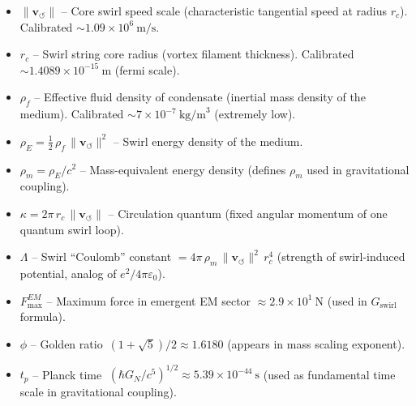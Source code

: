\documentclass[10pt,a4paper]{article}
\begin{document}
\begin{tcolorbox}[title=\textbf{SST Canonical Constants}]
\small
\begin{itemize}\itemsep1pt
\item $\|\mathbf{v}_{\!\boldsymbol{\circlearrowleft}}\|$ -- Core swirl speed scale (characteristic tangential speed at radius $r_c$). Calibrated $\sim1.09\times10^6~\text{m/s}$.
\item $r_c$ -- Swirl string core radius (vortex filament thickness). Calibrated $\sim1.4089\times10^{-15}~\text{m}$ (fermi scale).
\item $\rho_{\!f}$ -- Effective fluid density of condensate (inertial mass density of the medium). Calibrated $\sim7\times10^{-7}~\text{kg/m}^3$ (extremely low).
\item $\rho_{\!E} = \frac{1}{2}\,\rho_{\!f}\,\|\mathbf{v}_{\!\boldsymbol{\circlearrowleft}}\|^2$ -- Swirl energy density of the medium.
\item $\rho_{\!m} = \rho_{\!E}/c^2$ -- Mass-equivalent energy density (defines $\rho_{\!m}$ used in gravitational coupling).
\item $\kappa = 2\pi\,r_c\,\|\mathbf{v}_{\!\boldsymbol{\circlearrowleft}}\|$ -- Circulation quantum (fixed angular momentum of one quantum swirl loop).
\item $\Lambda$ -- Swirl “Coulomb” constant $=4\pi\,\rho_{\!m}\,\|\mathbf{v}_{\!\boldsymbol{\circlearrowleft}}\|^2\,r_c^4$ (strength of swirl-induced potential, analog of $e^2/4\pi\varepsilon_0$).
\item $F_{\max}^{EM}$ -- Maximum force in emergent EM sector $\approx2.9\times10^1~\text{N}$ (used in $G_{\text{swirl}}$ formula).
\item $\phi$ -- Golden ratio $\,(1+\sqrt{5})/2\approx1.6180$ (appears in mass scaling exponent).
\item $t_p$ -- Planck time $\;(\hbar G_N/c^5)^{1/2}\approx5.39\times10^{-44}~\text{s}$ (used as fundamental time scale in gravitational coupling).
\end{itemize}
\end{tcolorbox}
\end{document}
